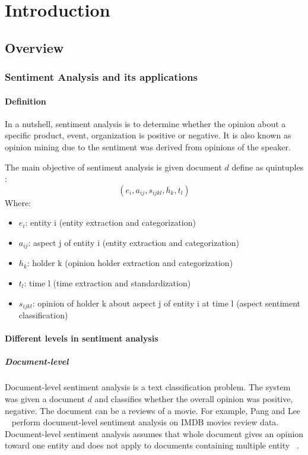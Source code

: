\hypertarget{chap:intro}{\chapter{Introduction}}
\section{Overview}
\subsection{Sentiment Analysis and its applications}
\subsubsection{Definition}
In a nutshell, sentiment analysis is to determine whether the opinion about a specific product, event, organization is positive or negative. It is also known as opinion mining due to the sentiment was derived from opinions of the speaker.

The main objective of sentiment analysis is given document $d$ define as quintuples \cite{liu2012sentiment}:
\[ ( e_{i}, a_{ij}, s_{ijkl}, h_{k}, t_{l} ) \]
 Where:
\begin{itemize}
	\item $e_{i}$: entity i (entity extraction and categorization)
	\item $a_{ij}$: aspect j of entity i (entity extraction and categorization)
	\item $h_{k}$: holder k (opinion holder extraction and categorization)
	\item $t_{l}$: time l (time extraction and standardization)
	\item $s_{ijkl}$: opinion of holder k about aspect j of entity i at time l (aspect sentiment classification)
\end{itemize}


\subsubsection{Different levels in sentiment analysis}
\paragraph{Document-level}
Document-level sentiment analysis is a text classification problem. The system was given a document $d$ and classifies whether the overall opinion was positive, negative. The document can be a reviews of a movie. For example, Pang and Lee ~\cite{pang2002thumbs} perform document-level sentiment analysis on IMDB movies review data. Document-level sentiment analysis assumes that whole document gives an opinion toward one entity and does not apply to documents containing multiple entity ~\cite{liu2012sentiment}.

